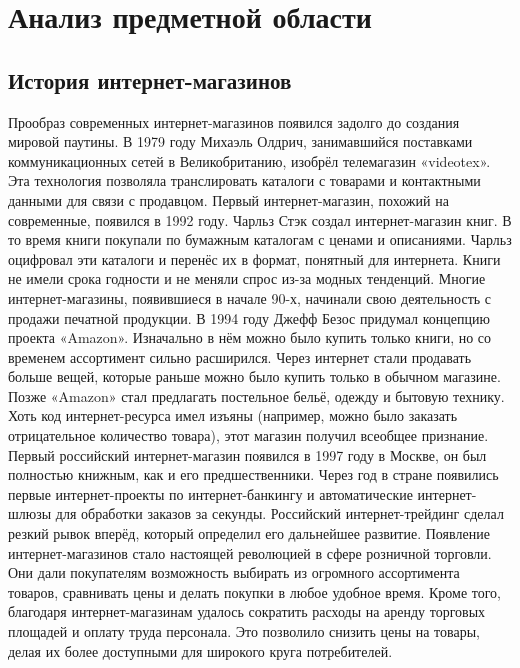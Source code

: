 \section{Анализ предметной области}
\subsection{История интернет-магазинов}
Прообраз современных интернет-магазинов появился задолго до создания мировой паутины. В 1979 году Михаэль Олдрич, занимавшийся поставками коммуникационных сетей в Великобританию, изобрёл телемагазин «videotex». Эта технология позволяла транслировать каталоги с товарами и контактными данными для связи с продавцом.
Первый интернет-магазин, похожий на современные, появился в 1992 году. Чарльз Стэк создал интернет-магазин книг. В то время книги покупали по бумажным каталогам с ценами и описаниями. Чарльз оцифровал эти каталоги и перенёс их в формат, понятный для интернета. Книги не имели срока годности и не меняли спрос из-за модных тенденций. Многие интернет-магазины, появившиеся в начале 90-х, начинали свою деятельность с продажи печатной продукции.
В 1994 году Джефф Безос придумал концепцию проекта «Amazon». Изначально в нём можно было купить только книги, но со временем ассортимент сильно расширился. Через интернет стали продавать больше вещей, которые раньше можно было купить только в обычном магазине. Позже «Amazon» стал предлагать постельное бельё, одежду и бытовую технику. Хоть код интернет-ресурса имел изъяны (например, можно было заказать отрицательное количество товара), этот магазин получил всеобщее признание.
Первый российский интернет-магазин появился в 1997 году в Москве, он был полностью книжным, как и его предшественники. Через год в стране появились первые интернет-проекты по интернет-банкингу и автоматические интернет-шлюзы для обработки заказов за секунды. Российский интернет-трейдинг сделал резкий рывок вперёд, который определил его дальнейшее развитие.
Появление интернет-магазинов стало настоящей революцией в сфере розничной торговли. Они дали покупателям возможность выбирать из огромного ассортимента товаров, сравнивать цены и делать покупки в любое удобное время.
Кроме того, благодаря интернет-магазинам удалось сократить расходы на аренду торговых площадей и оплату труда персонала. Это позволило снизить цены на товары, делая их более доступными для широкого круга потребителей.


